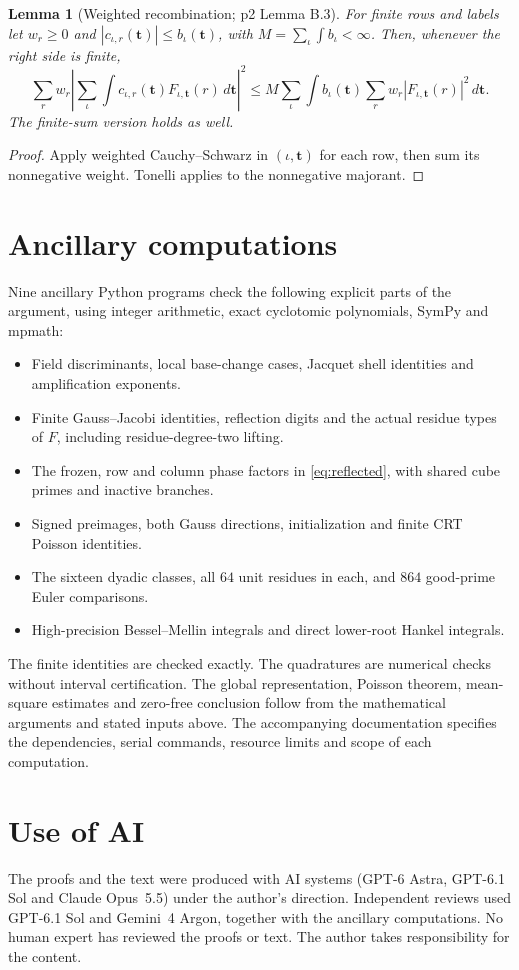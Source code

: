 \documentclass[11pt,a4paper]{article}
\numberwithin{equation}{section}
\newtheorem{lemma}[theorem]{Lemma}
\theoremstyle{definition}
\theoremstyle{remark}
\newcommand{\dd}{\,d}
\begin{document}
\begin{lemma}[Weighted recombination; p2 Lemma B.3]\label{lem:recombination}
For finite rows and labels let $w_r\ge0$ and
$|c_{\iota,r}(\boldsymbol t)|\le b_\iota(\boldsymbol t)$, with
$M=\sum_\iota\int b_\iota<\infty$. Then, whenever the right side is finite,
\[
 \sum_rw_r\left|\sum_\iota\int c_{\iota,r}(\boldsymbol t)
                              F_{\iota,\boldsymbol t}(r)\dd\boldsymbol t\right|^2
 \le M\sum_\iota\int b_\iota(\boldsymbol t)
                  \sum_rw_r|F_{\iota,\boldsymbol t}(r)|^2\dd\boldsymbol t .
\]
The finite-sum version holds as well.
\end{lemma}
\begin{proof}
Apply weighted Cauchy--Schwarz in $(\iota,\boldsymbol t)$ for each row, then sum its nonnegative weight. Tonelli applies to the nonnegative majorant.
\end{proof}

\section{Ancillary computations}\label{app:anc}
Nine ancillary Python programs check the following explicit parts of the argument, using integer arithmetic, exact cyclotomic polynomials, SymPy and mpmath:
\begin{itemize}
 \item Field discriminants, local base-change cases, Jacquet shell identities and amplification exponents.
 \item Finite Gauss--Jacobi identities, reflection digits and the actual residue types of $F$, including residue-degree-two lifting.
 \item The frozen, row and column phase factors in \eqref{eq:reflected}, with shared cube primes and inactive branches.
 \item Signed preimages, both Gauss directions, initialization and finite CRT Poisson identities.
 \item The sixteen dyadic classes, all $64$ unit residues in each, and $864$ good-prime Euler comparisons.
 \item High-precision Bessel--Mellin integrals and direct lower-root Hankel integrals.
\end{itemize}
The finite identities are checked exactly. The quadratures are numerical checks without interval certification. The global representation, Poisson theorem, mean-square estimates and zero-free conclusion follow from the mathematical arguments and stated inputs above. The accompanying documentation specifies the dependencies, serial commands, resource limits and scope of each computation.



\section*{Use of AI}
The proofs and the text were produced with AI systems (GPT-6 Astra, GPT-6.1 Sol and Claude Opus~5.5) under the author's direction. Independent reviews used GPT-6.1 Sol and Gemini~4 Argon, together with the ancillary computations. No human expert has reviewed the proofs or text. The author takes responsibility for the content.
\end{document}
